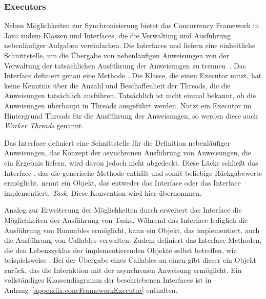 \subsubsection{Executors}\label{sec:executor} Neben Möglichkeiten zur Synchronisierung bietet das Concurrency Framework in Java zudem Klassen und Interfaces, die die Verwaltung und Ausführung nebenläufiger Aufgaben vereinfachen. Die Interfaces  und  liefern eine einheitliche Schnittstelle, um die Übergabe von nebenläufigen Anweisungen von der Verwaltung der tatsächlichen Ausführung der Anweisungen zu trennen~\cite[S.~70~ff.]{Friesen2015}. Das Interface  definiert genau eine Methode . Die Klasse, die einen Executor nutzt, hat keine Kenntnis über die Anzahl und Beschaffenheit der Threads, die die Anweisungen tatsächlich ausführen. Tatsächlich ist nicht einmal bekannt, ob die Anweisungen überhaupt in Threads ausgeführt werden. Nutzt ein Executor im Hintergrund Threads für die Ausführung der Anweisungen, so werden diese auch \emph{Worker Threads} genannt.

Das Interface  definiert eine Schnittstelle für die Definition nebenläufiger Anweisungen, das Konzept der asynchronen Ausführung von Anweisungen, die ein Ergebnis liefern, wird davon jedoch nicht abgedeckt. Diese Lücke schließt das Interface , das die generische Methode  enthält und somit beliebige Rückgabewerte ermöglicht. \textcite{Friesen2015} nennt ein Objekt, das entweder das Interface  oder das Interface  implementiert, \emph{Task}. Diese Konvention wird hier übernommen. 

Analog zur Erweiterung der Möglichkeiten durch  erweitert das Interface  die Möglichkeiten der Ausführung von Tasks. Während das Interface  lediglich die Ausführung von Runnables ermöglicht, kann ein Objekt, das  implementiert, auch die Ausführung von Callables verwalten. Zudem definiert das Interface Methoden, die den Lebenszyklus der implementierenden Objekte selbst betreffen, wie beispielsweise . Bei der Übergabe eines Callables an einen  gibt dieser ein Objekt  zurück, das die Interaktion mit der asynchronen Anweisung ermöglicht. Ein vollständiges Klassendiagramm der beschriebenen Interfaces ist in Anhang~\ref{appendix:concFrameworkExecutor} enthalten.

